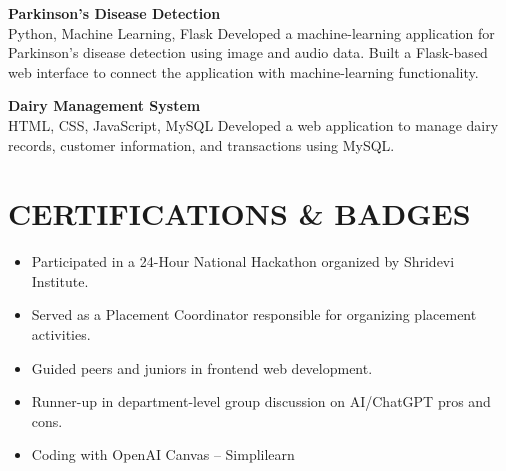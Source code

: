 \documentclass[10pt,a4paper]{article}
\begin{document}
\noindent \textbf{Parkinson’s Disease Detection} \\
Python, Machine Learning, Flask Developed a machine-learning application for Parkinson’s disease detection using image and audio data. Built a Flask-based web interface to connect the application with machine-learning functionality. \vspace{4pt}

\noindent \textbf{Dairy Management System} \\
HTML, CSS, JavaScript, MySQL Developed a web application to manage dairy records, customer information, and transactions using MySQL. \vspace{4pt}


\section*{CERTIFICATIONS \& BADGES}
\begin{itemize}[leftmargin=0.2in, itemsep=1pt, topsep=1pt]
    \item Participated in a 24-Hour National Hackathon organized by Shridevi Institute.
    \item Served as a Placement Coordinator responsible for organizing placement activities.
    \item Guided peers and juniors in frontend web development.
    \item Runner-up in department-level group discussion on AI/ChatGPT pros and cons.
    \item Coding with OpenAI Canvas – Simplilearn
\end{itemize}
\end{document}
